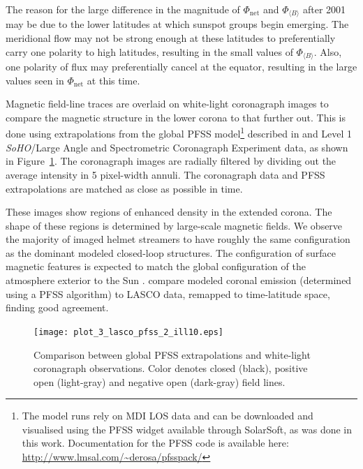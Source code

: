 The reason for the large difference in the magnitude of $\Phi_{\mathrm{net}}$ and $\Phi_{\langle B \rangle}$ after 2001 may be due to the lower latitudes at which sunspot groups begin emerging. The meridional flow may not be strong enough at these latitudes to preferentially carry one polarity to high latitudes, resulting in the small values of $\Phi_{\langle B \rangle}$. Also, one polarity of flux may preferentially cancel at the equator, resulting in the large values seen in $\Phi_{\mathrm{net}}$ at this time.

Magnetic field-line traces are overlaid on white-light coronagraph images to compare the magnetic structure in the lower corona to that further out. This is done using extrapolations from the global \gls{PFSS} model\footnote{The model runs rely on MDI LOS data and can be downloaded and visualised using the PFSS widget available through SolarSoft, as was done in this work. Documentation for the PFSS code is available here: \url{http://www.lmsal.com/\~derosa/pfsspack/}} described in \citet{Schrijver:2003} and Level 1 \emph{SoHO}/Large Angle and Spectrometric Coronagraph Experiment \citep[LASCO;][]{brueckner:1995} data, as shown in Figure~\ref{plot_3_lasco_pfss}. The coronagraph images are radially filtered by dividing out the average intensity in 5 pixel-width annuli. The coronagraph data and \gls{PFSS} extrapolations are matched as close as possible in time. 

These images show regions of enhanced density in the extended corona. The shape of these regions is determined by large-scale magnetic fields. We observe the majority of imaged helmet streamers to have roughly the same configuration as the dominant modeled closed-loop structures. The configuration of surface magnetic features is expected to match the global configuration of the atmosphere exterior to the Sun \citep{Schrijver:2003}. \citet{Wang:2009} compare modeled coronal emission (determined using a \gls{PFSS} algorithm) to LASCO data, remapped to time-latitude space, finding good agreement. 

\begin{landscape}
\begin{figure}[!t]
\centerline{\texttt{[image: plot\_3\_lasco\_pfss\_2\_ill10.eps]}}
\caption[Comparison between PFSS extrapolations and white-light images.]{Comparison between global PFSS extrapolations and white-light coronagraph observations. Color denotes closed (black), positive open (light-gray) and negative open (dark-gray) field lines.}\label{plot_3_lasco_pfss}
\end{figure}
\end{landscape}

